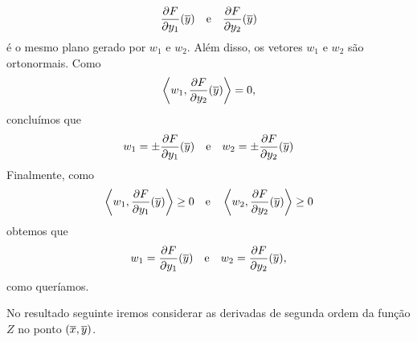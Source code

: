 \begin{demonstracao}
\begin{equation*}
\frac{\partial F}{\partial y_1}(\overline{y}) \quad \text{e} \quad 
\frac{\partial F}{\partial y_2}(\overline{y})
\end{equation*}
é o mesmo plano gerado por $w_1$ e $w_2$. Al\'em disso, os vetores
$w_1$ e $w_2$ s\~ao ortonormais. Como
\begin{equation*}
\left\langle w_1, \frac{\partial F}{\partial y_2}(\overline{y}) \right\rangle = 0,
\end{equation*}
conclu\'imos que
\begin{equation*}
w_1 = \pm \frac{\partial F}{\partial y_1}(\overline{y}) 
\quad \text{e} \quad 
w_2 = \pm \frac{\partial F}{\partial y_2}(\overline{y})
\end{equation*}
Finalmente, como
\begin{equation*}
\left\langle w_1, \frac{\partial F}{\partial y_1}(\overline{y}) \right\rangle \geq 0 
\quad \text{e} \quad 
\left\langle w_2, \frac{\partial F}{\partial y_2}(\overline{y}) \right\rangle \geq 0
\end{equation*}	
obtemos que
\begin{equation*}
w_1 = \frac{\partial F}{\partial y_1}(\overline{y}) \quad \text{e} \quad 
w_2 = \frac{\partial F}{\partial y_2}(\overline{y}),
\end{equation*}
como quer\'iamos.
\end{demonstracao}

No resultado seguinte iremos considerar as derivadas de segunda
ordem da fun\c c\~ao $Z$ no ponto $(\overline{x},\overline{y})$.

